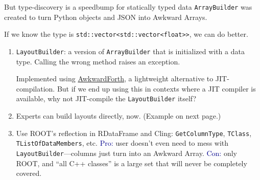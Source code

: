 \documentclass[aspectratio=169]{beamer}
\begin{document}
\begin{frame}{But type-discovery is a speedbump for statically typed data}
\vspace{0.35 cm}
\texttt{ArrayBuilder} was created to turn Python objects and JSON into Awkward Arrays.

\vspace{0.25 cm}
If we know the type is \texttt{std::vector<std::vector<float>>}, we can do better.

\vspace{0.25 cm}
\begin{enumerate}\setlength{\itemsep}{0.3 cm}
\item<2-> \texttt{LayoutBuilder}: a version of \texttt{ArrayBuilder} that is initialized with a data type. Calling the wrong method raises an exception.

\vspace{0.2 cm}
Implemented using \textcolor{blue}{\href{https://arxiv.org/abs/2102.13516}{AwkwardForth}}, a lightweight alternative to JIT-compilation. But if we end up using this in contexts where a JIT compiler is available, why not JIT-compile the \texttt{LayoutBuilder} itself?

\item<3-> Experts can build layouts directly, now. (Example on next page.)

\item<4-> Use ROOT's reflection in RDataFrame and Cling: \texttt{GetColumnType}, \texttt{TClass}, \texttt{TListOfDataMembers}, etc. \textcolor{darkblue}{Pro:} user doesn't even need to mess with \texttt{LayoutBuilder}---columns just turn into an Awkward Array. \textcolor{darkblue}{Con:} only ROOT, and ``all C++ classes'' is a large set that will never be completely covered.
\end{enumerate}
\end{frame}
\end{document}

